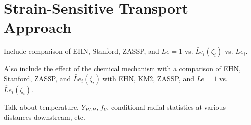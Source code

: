 \section{Strain-Sensitive Transport Approach}
\label{sec:lesresults:ssta}

Include comparison of EHN, Stanford, ZASSP, and $Le = 1$ vs. $\check{Le}_i(\zeta_i)$ vs. $Le_i$.

Also include the effect of the chemical mechanism with a comparison of EHN, Stanford, ZASSP, and $\check{Le}_i(\zeta_i)$ with EHN, KM2, ZASSP, and $Le = 1$ vs. $\check{Le}_i(\zeta_i)$.

Talk about temperature, $Y_{PAH}$, $f_V$, conditional radial statistics at various distances downstream, etc.
